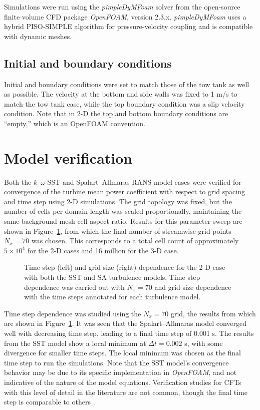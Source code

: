 Simulations were run using the \textit{pimpleDyMFoam} solver from the
open-source finite volume CFD package \textit{OpenFOAM}, version 2.3.x.
\textit{pimpleDyMFoam} uses a hybrid PISO-SIMPLE algorithm for pressure-velocity
coupling and is compatible with dynamic meshes.

\subsection{Initial and boundary conditions}

Initial and boundary conditions were set to match those of the tow tank as well
as possible. The velocity at the bottom and side walls was fixed to 1 m/s to
match the tow tank case, while the top boundary condition was a slip velocity
condition. Note that in 2-D the top and bottom boundary conditions are
``empty,'' which is an OpenFOAM convention.


\section{Model verification}

Both the $k$--$\omega$ SST and Spalart--Allmaras RANS model cases were verified
for convergence of the turbine mean power coefficient with respect to grid
spacing and time step using 2-D simulations. The grid topology was fixed, but
the number of cells per domain length was scaled proportionally, maintaining the
same background mesh cell aspect ratio. Results for this parameter sweep are
shown in Figure~\ref{fig:verification}, from which the final number of
streamwise grid points $N_x = 70$ was chosen. This corresponds to a total cell
count of approximately $5 \times 10^4$ for the 2-D cases and 16 million for the
3-D case.

\begin{figure}[ht]
    \centering


    \caption{Time step (left) and grid size (right) dependence for the 2-D case
        with both the SST and SA turbulence models. Time step dependence was carried
        out with $N_x=70$ and grid size dependence with the time steps annotated for
        each turbulence model.}

    \label{fig:verification}
\end{figure}

Time step dependence was studied using the $N_x=70$ grid, the results from which
are shown in Figure~\ref{fig:verification}. It was seen that the
Spalart--Allmaras model converged well with decreasing time step, leading to a
final time step of 0.001 s. The results from the SST model show a local minimum
at $\Delta t = 0.002$ s, with some divergence for smaller time steps. The local
minimum was chosen as the final time step to run the simulations. Note that the
SST model's convergence behavior may be due to its specific implementation in
\textit{OpenFOAM}, and not indicative of the nature of the model equations.
Verification studies for CFTs with this level of detail in the literature are
not common, though the final time step is comparable to others
\cite{Balduzzi2016}.


